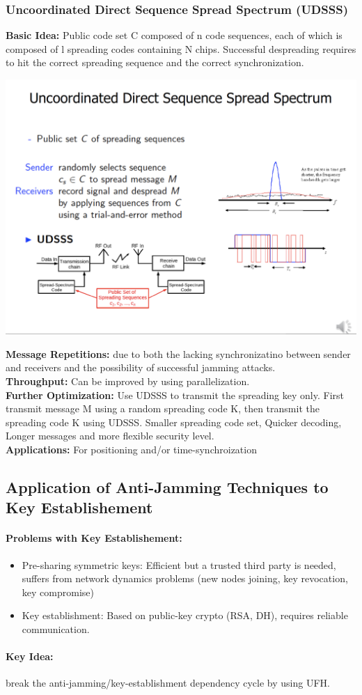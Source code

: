 \subsubsection{Uncoordinated Direct Sequence Spread Spectrum (UDSSS)}
\textbf{Basic Idea:} Public code set C composed of n code sequences, each of which is composed of l spreading codes containing N chips. Successful despreading requires to hit the correct spreading sequence and the correct synchronization.
\begin{minipage}{\linewidth}
    \centering      
    \includegraphics[width=\linewidth]{Figures/L3_udsss.PNG} 
\end{minipage}
\textbf{Message Repetitions:} due to both the lacking synchronizatino between sender and receivers and the possibility of successful jamming attacks.\\
\textbf{Throughput:} Can be improved by using parallelization.\\
\textbf{Further Optimization:} Use UDSSS to transmit the spreading key only. First transmit message M using a random spreading code K, then transmit the spreading code K using UDSSS. Smaller spreading code set, Quicker decoding, Longer messages and more flexible security level.\\
\textbf{Applications:} For positioning and/or time-synchroization

\subsection{Application of Anti-Jamming Techniques to Key Establishement}

\paragraph{Problems with Key Establishement:}
\begin{itemize}
    \item Pre-sharing symmetric keys: Efficient but a trusted third party is needed, suffers from network dynamics problems (new nodes joining, key revocation, key compromise)
    \item Key establishment: Based on public-key crypto (RSA, DH), requires reliable communication.
\end{itemize}

\paragraph{Key Idea:} break the anti-jamming/key-establishment dependency cycle by using UFH.

